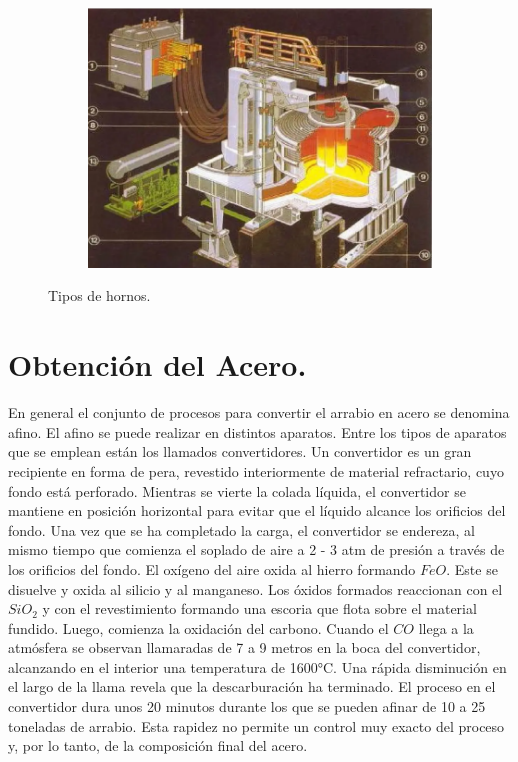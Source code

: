 \documentclass[12pt,a4paper]{article}
\begin{document}
\begin{figure}[h!]
\begin{subfigure}{0.45\textwidth}
        \label{crisol}
    \end{subfigure}
    \hfill
    \begin{subfigure}{0.45\textwidth}
        \centering
        \includegraphics[width=\textwidth]{Inagenes para latex/arco electrico.png}
        \label{electrico}
    \end{subfigure}
    \caption{Tipos de hornos.}
    \label{hornos}
\end{figure}

\section{Obtención del Acero.}
En general el conjunto de procesos para convertir el arrabio en acero se denomina afino. El afino se puede realizar en distintos aparatos. Entre los tipos de aparatos que se emplean están los llamados convertidores.
Un convertidor es un gran recipiente en forma de pera, revestido interiormente de material refractario, cuyo fondo está perforado. Mientras se vierte la colada líquida, el convertidor se mantiene en posición horizontal para evitar que el líquido alcance los orificios del fondo. Una vez que se ha completado la carga, el convertidor se endereza, al mismo tiempo que comienza el soplado de aire a 2 - 3 atm de presión a través de los orificios del fondo. El oxígeno del aire oxida al hierro formando $FeO$. Este se disuelve y oxida al silicio y al manganeso. Los óxidos formados reaccionan con el $SiO_2$ y con el revestimiento formando una escoria que flota sobre el material fundido. Luego, comienza la oxidación del carbono. Cuando el $CO$ llega a la atmósfera se observan llamaradas de 7 a 9 metros en la boca del convertidor, alcanzando en el interior una temperatura de 1600°C. Una rápida disminución en el largo de la llama revela que la descarburación ha terminado. El proceso en el convertidor dura unos 20 minutos durante los que se pueden afinar de 10 a 25 toneladas de arrabio. Esta rapidez no permite un control muy exacto del proceso y, por lo tanto, de la composición final del acero.
\end{document}
